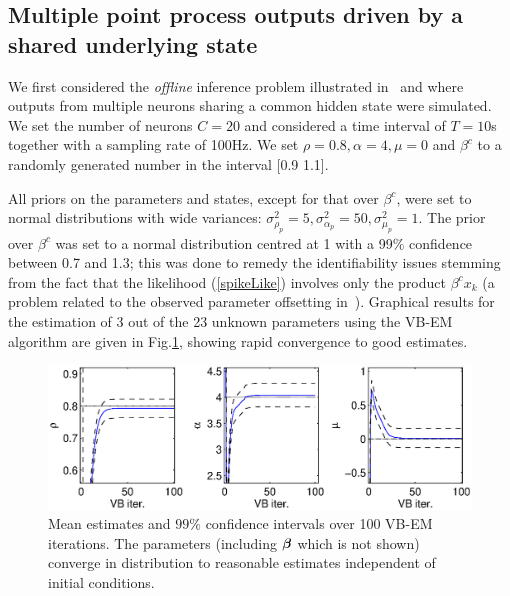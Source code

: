 \documentclass{article}
\begin{document}
\subsection{Multiple point process outputs driven by a shared underlying state}

We first considered the \emph{offline} inference problem illustrated in~\cite{Smith_2003} and
\cite{Yuan_2010} where outputs from multiple neurons sharing a common hidden state were simulated.
We set the number of neurons $C = 20$ and considered a time interval of $T=10$s together with a
sampling rate of 100Hz. We set $\rho = 0.8, \alpha = 4, \mu = 0$ and $\beta^c$ to a randomly
generated number in the interval [0.9 1.1].

All priors on the parameters and states, except for that over $\beta^c$, were set to normal
distributions with wide variances: $\sigma^2_{\rho_p} = 5, \sigma^2_{\alpha_p} = 50,
\sigma^2_{\mu_p} = 1$. The prior over $\beta^c$ was set to a normal distribution centred at 1 with a
99$\%$ confidence between 0.7 and 1.3; this was done to remedy the identifiability issues stemming
from the fact that the likelihood (\ref{spikeLike}) involves only the product $\beta^c x_k$ (a
problem related to the observed parameter offsetting in~\cite{Smith_2003}). Graphical results for the estimation of 3 out of the 23
unknown parameters using the VB-EM algorithm are given in Fig.\ref{fig:parVB}, showing rapid
convergence to good estimates.


%
% 	

\begin{figure}[ht]
\begin{center}
\includegraphics[width = 5.5in]{./Figures/parVB.eps}
\caption{Mean estimates and $99\%$ confidence intervals over 100 VB-EM iterations. The
parameters (including ${\bm \beta}$ which is not shown) converge in distribution to reasonable estimates
independent of initial conditions.} \label{fig:parVB}
\end{center}
\end{figure}
\end{document}
